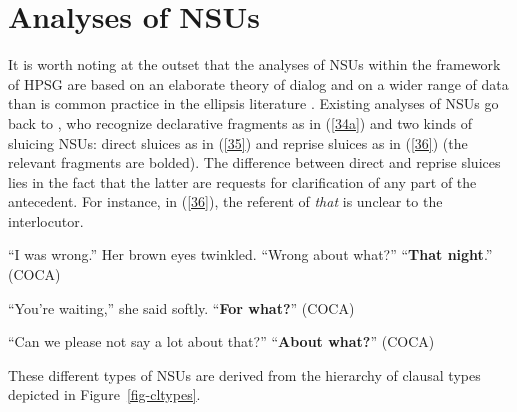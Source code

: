 \section{Analyses of NSUs}
\label{sec-analyses-of-NSUs}

It is worth noting at the outset that the analyses of NSUs within the framework of HPSG are based on an elaborate theory of dialog  and on a wider range of data than is common practice in the ellipsis literature \citep{Ginzburg1994, Ginzburg2004, Ginzburg2014a, Larsson2002, Purver2006, Fernandez2006, Fernandez2002, Fernandez2007, Ginzburg2010, Ginzburg2014b, Ginzburg2012, Ginzburg2013, Kim2019}. Existing analyses of NSUs go back to \citet{Ginzburg:Sag:2000}, who recognize declarative fragments as in (\ref{34a}) and two kinds of sluicing NSUs: direct sluices as in (\ref{35}) and reprise sluices as  in (\ref{36}) (the relevant fragments are bolded). The difference between direct and reprise sluices lies in the fact that the latter are requests for clarification of any part of the antecedent. For instance, in (\ref{36}), the referent of \textit{that} is unclear to the interlocutor.

\ea ``I was wrong.'' Her brown eyes twinkled. ``Wrong about what?'' ``\textbf{That night}.'' (COCA) \label{34a}\z

\ea ``You're waiting,'' she said softly. ``\textbf{For what?}'' (COCA) \label{35} \z

\ea ``Can we please not say a lot about that?'' ``\textbf{About what?}'' (COCA) \label{36} \z


These different types of NSUs are derived from the \citet[333]{Ginzburg:Sag:2000} hierarchy of clausal types depicted in Figure~\ref{fig-cltypes}.


